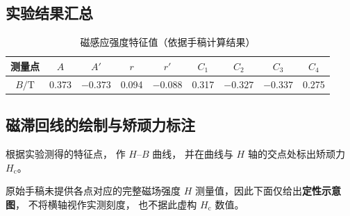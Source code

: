 \documentclass[UTF8,a4paper,12pt,fontset=none]{ctexart}
\begin{document}

\subsection{实验结果汇总}

\begin{table}[H]
\centering

\caption{磁感应强度特征值（依据手稿计算结果）}

\begin{tabular}{ccccccccc}
\toprule

测量点
& $A$
& $A'$
& $r$
& $r'$
& $C_1$
& $C_2$
& $C_3$
& $C_4$
\\
\midrule

$B/\mathrm T$
& 0.373
& $-0.373$
& 0.094
& $-0.088$
& 0.317
& $-0.327$
& $-0.337$
& 0.275
\\

\bottomrule
\end{tabular}
\end{table}


\subsection{磁滞回线的绘制与矫顽力标注}

根据实验测得的特征点，
作 $H$--$B$ 曲线，
并在曲线与 $H$ 轴的交点处标出矫顽力
$H_{\mathrm c}$。

原始手稿未提供各点对应的完整磁场强度 $H$
测量值，因此下面仅给出\textbf{定性示意图}，
不将横轴视作实测刻度，
也不据此虚构 $H_{\mathrm c}$ 数值。
\end{document}
